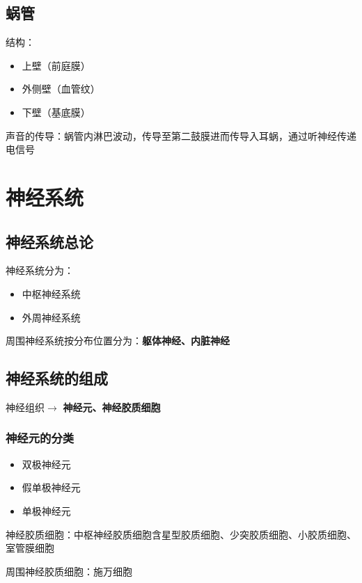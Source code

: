 \subsection{蜗管}%
\label{sub:蜗管}
结构：
\begin{itemize}
    \item 上壁（前庭膜）
    \item 外侧壁（血管纹）
    \item 下壁（基底膜）
\end{itemize}
声音的传导：蜗管内淋巴波动，传导至第二鼓膜进而传导入耳蜗，通过听神经传递电信号
\section{神经系统}%
\label{sec:神经系统}
\subsection{神经系统总论}%
\label{sub:神经系统总论}
神经系统分为：
\begin{itemize}
    \item 中枢神经系统
    \item 外周神经系统
\end{itemize}
周围神经系统按分布位置分为：\textbf{躯体神经、内脏神经}
\subsection{神经系统的组成}%
\label{sub:神经系统的组成}
神经组织$\to $ \textbf{神经元、神经胶质细胞}
\subsubsection*{神经元的分类}%
\label{subsub:神经元的分类}
\begin{itemize}
    \item 双极神经元
    \item 假单极神经元
    \item 单极神经元
\end{itemize}
\begin{notation}
    神经胶质细胞：中枢神经胶质细胞含星型胶质细胞、少突胶质细胞、小胶质细胞、室管膜细胞

    周围神经胶质细胞：施万细胞
\end{notation}
